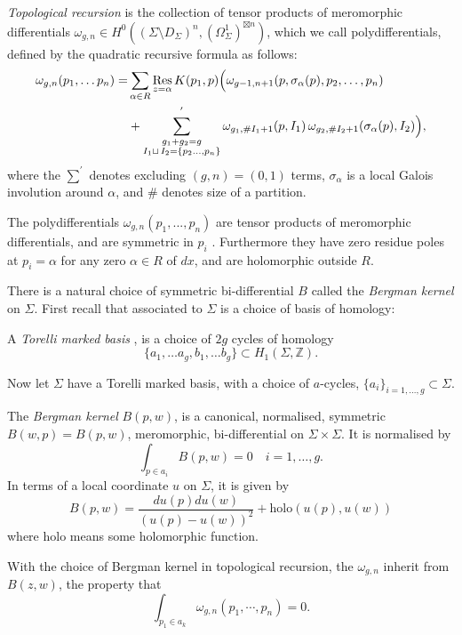     \begin{defn}\label{defn:tr} \emph{Topological recursion} is the collection of tensor products of meromorphic differentials \( \omega_{g,n} \in  H^0((\Sigma \setminus D_\Sigma)^n,(\Omega^1_\Sigma)^{\boxtimes n})\), which we call polydifferentials, defined by the quadratic recursive formula as follows:
    \begin{align*} 
    \omega_{g,n}(p_1, \dots p_n) =& \sum_{\alpha \in R } \operatorname*{Res}_{z = \alpha}  K(p_1, p)     \Big( \omega_{g-1, n+1} (p, \sigma_\alpha(p), p_2, \dots, p_n) \\
        &+ \sum^{'}_{\substack{g_1 + g_2 = g \\ I_1 \sqcup \, I_2 = \{p_2\dots,p_n\} }} \omega_{g_1, \# I_1+1}(p,I_1) \, \omega_{g_2, \#I_2  +1}(\sigma_{\alpha}(p), I_2) \Big),
    \end{align*}
    where the \( \sum^{'}\) denotes excluding \((g,n)=(0,1)\) terms, \( \sigma_{\alpha}\) is a local Galois involution around \( \alpha\), and \( \#\) denotes size of a partition.
    \end{defn}
    The polydifferentials \(\omega_{g,n}(p_1,..., p_n)\) are tensor products of meromorphic differentials, and are symmetric in \(p_i\) \cite{eynard_orantin}. Furthermore they have zero residue poles at \(p_i=\alpha\) for any zero \( \alpha \in R\) of \(dx\), and are holomorphic outside \(R\). 

    There is a natural choice of symmetric bi-differential \(B\) called the \emph{Bergman kernel} on \( \Sigma\). First recall that associated to \( \Sigma\) is a choice of basis of homology:
    \begin{defn}
    A \emph{Torelli marked basis} \cite{bertola}, is a choice of \(2g\) cycles of homology \[  \{a_1, \dots a_g, b_1, \dots b_g\} \subset H_1(\Sigma, \mathbb{Z}).\]
    \end{defn}

    
    Now let \( \Sigma\) have a Torelli marked basis, with a choice of \(a\)-cycles, \( \{a_i\}_{i=1,...,g}\subset\Sigma\).
    \begin{defn}
    The \emph{Bergman kernel} \(B(p,w)\), is a canonical, normalised, symmetric \(B(w,p)=B(p,w)\), meromorphic, bi-differential on \( \Sigma \times \Sigma\).  It is normalised by 
    \[ \int_{p \in a_i}B(p,w)=0 \quad i=1,\dots,g. \]
    In terms of a local coordinate \(u\) on \( \Sigma\), it is given by
    \[ B(p,w)=\frac{du(p)du(w)}{(u(p)-u(w))^2}+\mathrm{holo}(u(p),u(w)) \]
    where \( \mathrm{holo}\) means some holomorphic function.
    \end{defn}
    With the choice of Bergman kernel in topological recursion, the \( \omega_{g,n}\) inherit from \(B(z,w)\), the property that 
    \[ \int_{p_1 \in a_k}\omega_{g,n}(p_1,\cdots,p_n) = 0.\]
    
